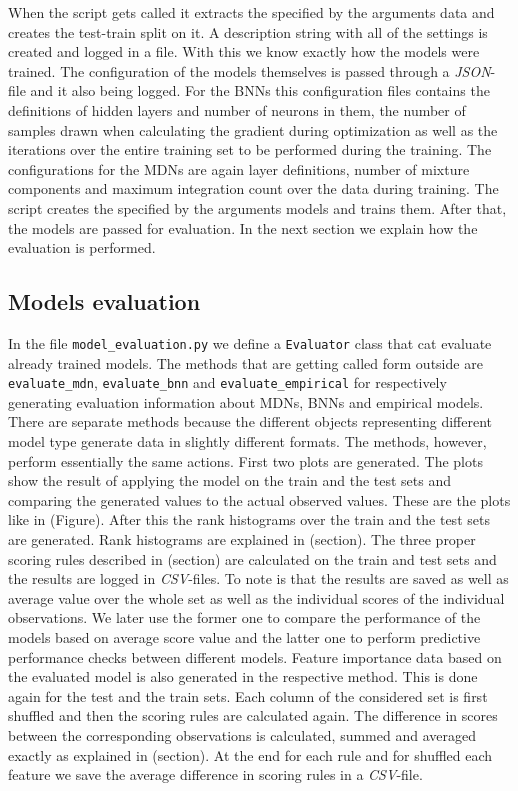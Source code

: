 \documentclass[12pt,a4paper,twoside]{scrartcl}
\numberwithin{equation}{section}
\begin{document}
When the script gets called it extracts the specified by the arguments data and creates the test-train split on it. A description string with all of the settings is created and logged in a file. With this we know exactly how the models were trained. The configuration of the models themselves is passed through a \emph{JSON}-file and it also being logged. For the BNNs this configuration files contains the definitions of hidden layers and number of neurons in them, the number of samples drawn when calculating the gradient during optimization as well as the iterations over the entire training set to be performed during the training. The configurations for the MDNs are again layer definitions, number of mixture components and maximum integration count over the data during training. The script creates the specified by the arguments models and trains them. After that, the models are passed for evaluation. In the next section we explain how the evaluation is performed.
\subsection{Models evaluation}
\label{sec:models-eval}
In the file \texttt{model\_evaluation.py} we define a \texttt{Evaluator} class that cat evaluate already trained models. The methods that are getting called form outside are \texttt{evaluate\_mdn}, \texttt{evaluate\_bnn} and \texttt{evaluate\_empirical} for respectively generating evaluation information about MDNs, BNNs and empirical models. There are separate methods because the different objects representing different model type generate data in slightly different formats. The methods, however, perform essentially the same actions. First two plots are generated. The plots show the result of applying the model on the train and the test sets and comparing the generated values to the actual observed values. These are the plots like in (Figure). After this the rank histograms over the train and the test sets are generated. Rank histograms are explained in (section). The three proper scoring rules described in (section) are calculated on the train and test sets and the results are logged in \emph{CSV}-files. To note is that the results are saved as well as average value over the whole set as well as the individual scores of the individual observations. We later use the former one to compare the performance of the models based on average score value and the latter one to perform predictive performance checks between different models. Feature importance data based on the evaluated model is also generated in the respective method. This is done again for the test and the train sets. Each column of the considered set is first shuffled and then the scoring rules are calculated again. The difference in scores between the corresponding observations is calculated, summed and averaged exactly as explained in (section). At the end for each rule and for shuffled each feature we save the average difference in scoring rules in a \emph{CSV}-file.
\end{document}
